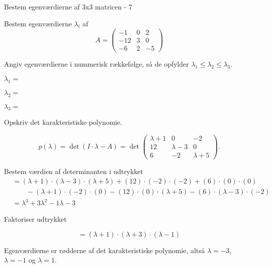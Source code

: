 \documentclass{article}
\begin{document}
\begin{exercise}{Bestem egenværdierne af 3x3 matricen - 7}

Bestem egenværdierne $\lambda_i$ af 
\[
A=\begin{pmatrix}
-1 & 0 & 2 \\
-12 & 3 & 0 \\
-6 & 2 & -5
\end{pmatrix}
\]

Angiv egenværdierne i nummerisk rækkefølge, så de
opfylder $\lambda_1 \le \lambda_2 \le \lambda_3$.

$\lambda_1 = $ 

$\lambda_2 = $ 

$\lambda_3 = $ 

\hint
Opskriv det karakteristiske polynomie.

\hint
\[
p(\lambda)=\det\left(I \cdot \lambda - A \right)=\det\begin{pmatrix}
\lambda + 1 & 0 & -2 \\
12 & \lambda - 3 & 0 \\
6 & -2 & \lambda + 5
\end{pmatrix}.
\]

\hint
Bestem værdien af determinanten i udtrykket
\begin{align*}
& =(\lambda+1) \cdot (\lambda-3) \cdot (\lambda+5)+(12) \cdot (-2) \cdot (-2)+(6) \cdot (0) \cdot (0) \\
& \qquad -(\lambda+1) \cdot (-2) \cdot (0)-(12) \cdot (0) \cdot (\lambda+5)-(6) \cdot (\lambda-3) \cdot (-2) \\
& =\lambda^3+3\lambda^2-1\lambda-3
\end{align*}

\hint
Faktoriser udtrykket

\hint
\[
=(\lambda+1) \cdot (\lambda+3) \cdot (\lambda-1)
\]

\hint
Egenværdierne er rødderne af det karakteristiske polynomie, 
altså
$\lambda=-3$, $\lambda=-1$ og $\lambda=1$.

\end{exercise}
\end{document}
